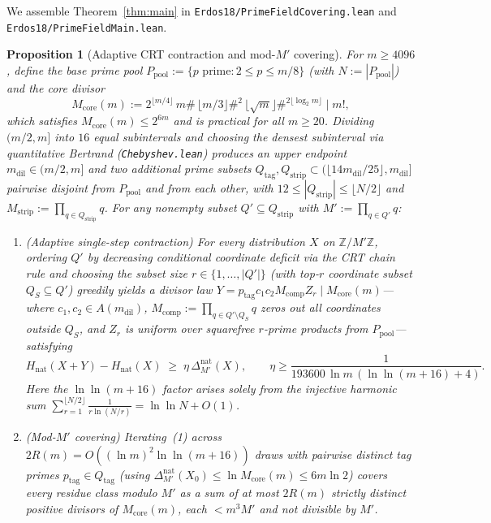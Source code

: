 \documentclass[11pt,a4paper]{amsart}
\newtheorem{proposition}[theorem]{Proposition}
\theoremstyle{definition}
\theoremstyle{remark}
\newcommand{\Z}{\mathbb{Z}}
\begin{document}
We assemble Theorem~\ref{thm:main} in \texttt{Erdos18/PrimeFieldCovering.lean} and \texttt{Erdos18/PrimeFieldMain.lean}.

\begin{proposition}[Adaptive CRT contraction and mod-$M'$ covering]\label{prop:crt}
For $m \ge 4096$, define the base prime pool $P_{\mathrm{pool}} := \{p \text{ prime} : 2 \le p \le m/8\}$ (with $N := |P_{\mathrm{pool}}|$) and the core divisor
\[
  M_{\mathrm{core}}(m) := 2^{\lfloor m/4 \rfloor}\, m\#\, \lfloor m/3 \rfloor\#^2\, \lfloor \sqrt{m} \rfloor\#^{2\lfloor \log_2 m \rfloor} \;\Big|\; m!,
\]
which satisfies $M_{\mathrm{core}}(m) \le 2^{6m}$ and is practical for all $m \ge 20$. Dividing $(m/2, m]$ into $16$ equal subintervals and choosing the densest subinterval via quantitative Bertrand (\texttt{Chebyshev.lean}) produces an upper endpoint $m_{\mathrm{dil}} \in (m/2, m]$ and two additional prime subsets $Q_{\mathrm{tag}}, Q_{\mathrm{strip}} \subset (\lfloor 14 m_{\mathrm{dil}}/25 \rfloor, m_{\mathrm{dil}}]$ pairwise disjoint from $P_{\mathrm{pool}}$ and from each other, with $12 \le |Q_{\mathrm{strip}}| \le \lfloor N/2 \rfloor$ and $M_{\mathrm{strip}} := \prod_{q \in Q_{\mathrm{strip}}} q$. For any nonempty subset $Q' \subseteq Q_{\mathrm{strip}}$ with $M' := \prod_{q \in Q'} q$:
\begin{enumerate}
  \item \emph{(Adaptive single-step contraction)} For every distribution $X$ on $\Z/M'\Z$, ordering $Q'$ by decreasing conditional coordinate deficit via the CRT chain rule and choosing the subset size $r \in \{1,\dots,|Q'|\}$ (with top-$r$ coordinate subset $Q_S \subseteq Q'$) greedily yields a divisor law $Y = p_{\mathrm{tag}} c_1 c_2 M_{\mathrm{comp}} Z_r \mid M_{\mathrm{core}}(m)$—where $c_1, c_2 \in A(m_{\mathrm{dil}})$, $M_{\mathrm{comp}} := \prod_{q \in Q' \setminus Q_S} q$ zeros out all coordinates outside $Q_S$, and $Z_r$ is uniform over squarefree $r$-prime products from $P_{\mathrm{pool}}$—satisfying
  \[
    H_{\mathrm{nat}}(X + Y) - H_{\mathrm{nat}}(X) \;\ge\; \eta\, \Delta_{M'}^{\mathrm{nat}}(X),
    \qquad \eta \ge \frac{1}{193600\,\ln m\,(\ln\ln(m+16)+4)}.
  \]
  Here the $\ln\ln(m+16)$ factor arises solely from the injective harmonic sum $\sum_{r=1}^{\lfloor N/2 \rfloor} \frac{1}{r\ln(N/r)} = \ln\ln N + O(1)$.
  \item \emph{(Mod-$M'$ covering)} Iterating~(1) across $2R(m) = O((\ln m)^2 \ln\ln(m+16))$ draws with pairwise distinct tag primes $p_{\mathrm{tag}} \in Q_{\mathrm{tag}}$ (using $\Delta_{M'}^{\mathrm{nat}}(X_0) \le \ln M_{\mathrm{core}}(m) \le 6m\ln 2$) covers every residue class modulo $M'$ as a sum of at most $2R(m)$ strictly distinct positive divisors of $M_{\mathrm{core}}(m)$, each $< m^3 M'$ and not divisible by $M'$.

\end{enumerate}
\end{proposition}
\end{document}
